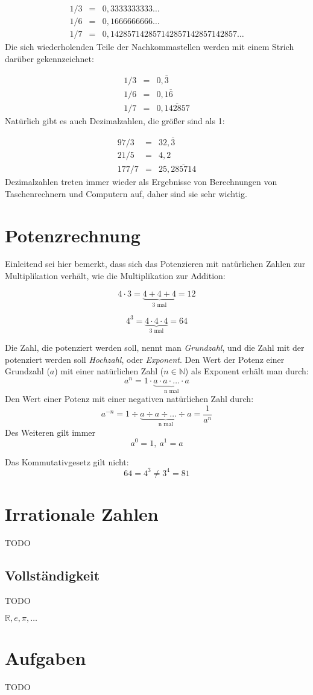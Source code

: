 \begin{eqnarray*}
1/3 &=& 0,3333333333\dots \\
1/6 &=& 0,1666666666\dots \\
1/7 &=& 0,142857142857142857142857142857\dots
\end{eqnarray*}
Die sich wiederholenden Teile der Nachkommastellen werden mit einem Strich darüber gekennzeichnet:

\begin{eqnarray*}
1/3 &=& 0,\overline{3} \\
1/6 &=& 0,1\overline{6} \\
1/7 &=& 0,\overline{142857}
\end{eqnarray*}
Natürlich gibt es auch Dezimalzahlen, die größer sind als 1:

\begin{eqnarray*}
97/3 &=& 32,\overline{3} \\
21/5 &=& 4,2 \\
177/7 &=& 25,\overline{285714}
\end{eqnarray*}
Dezimalzahlen treten immer wieder als Ergebnisse von Berechnungen von Taschenrechnern und Computern auf, daher sind sie sehr wichtig. 


\section{Potenzrechnung}

Einleitend sei hier bemerkt, dass sich das Potenzieren mit natürlichen Zahlen zur Multiplikation verhält, wie die Multiplikation zur Addition:

\[ 4\cdot 3 = \underbrace{4+4+4}_{\text{3 mal}} = 12 \]

\[ 4^3 = \underbrace{4\cdot 4\cdot 4}_{\text{3 mal}} = 64 \]

\begin{definition}
Die Zahl, die potenziert werden soll, nennt man \textsl{Grundzahl}, und die Zahl mit der potenziert werden soll \textsl{Hochzahl}, oder \textsl{Exponent}. Den Wert der Potenz einer Grundzahl ($a$) mit einer natürlichen Zahl ($n \in \mathbb{N}$) als Exponent erhält man durch:
\[ a^n = 1\cdot \underbrace{a\cdot a \cdot \dots \cdot a}_{\text{n mal}} \]
Den Wert einer Potenz mit einer negativen natürlichen Zahl durch:
\[ a^{-n} = 1 \div \underbrace{a\div a \div \dots \div a}_{\text{n mal}} = \frac{1}{a^n} \]
Des Weiteren gilt immer
\[ a^0 = 1,\ a^1=a \]
\end{definition}
Das Kommutativgesetz gilt nicht:
\[ 64 = 4^3 \ne 3^4 = 81 \]


\section{Irrationale Zahlen}

TODO


\subsection{Vollständigkeit}

TODO

$\mathbb{R}, e, \pi, \dots $

\section{Aufgaben}
TODO
